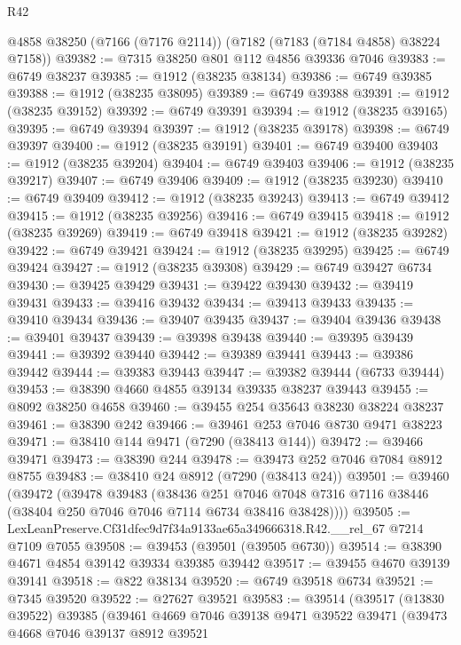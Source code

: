\begin{lexlean}{R42}
\begin{coremodule}
{    @4858
    @38250
    (@7166 (@7176 @2114))
    (@7182 (@7183 (@7184 @4858) @38224 @7158))
@39382 := @7315 @38250 @801 @112 @4856 @39336 @7046
@39383 := @6749 @38237
@39385 := @1912 (@38235 @38134)
@39386 := @6749 @39385
@39388 := @1912 (@38235 @38095)
@39389 := @6749 @39388
@39391 := @1912 (@38235 @39152)
@39392 := @6749 @39391
@39394 := @1912 (@38235 @39165)
@39395 := @6749 @39394
@39397 := @1912 (@38235 @39178)
@39398 := @6749 @39397
@39400 := @1912 (@38235 @39191)
@39401 := @6749 @39400
@39403 := @1912 (@38235 @39204)
@39404 := @6749 @39403
@39406 := @1912 (@38235 @39217)
@39407 := @6749 @39406
@39409 := @1912 (@38235 @39230)
@39410 := @6749 @39409
@39412 := @1912 (@38235 @39243)
@39413 := @6749 @39412
@39415 := @1912 (@38235 @39256)
@39416 := @6749 @39415
@39418 := @1912 (@38235 @39269)
@39419 := @6749 @39418
@39421 := @1912 (@38235 @39282)
@39422 := @6749 @39421
@39424 := @1912 (@38235 @39295)
@39425 := @6749 @39424
@39427 := @1912 (@38235 @39308)
@39429 := @6749 @39427 @6734
@39430 := @39425 @39429
@39431 := @39422 @39430
@39432 := @39419 @39431
@39433 := @39416 @39432
@39434 := @39413 @39433
@39435 := @39410 @39434
@39436 := @39407 @39435
@39437 := @39404 @39436
@39438 := @39401 @39437
@39439 := @39398 @39438
@39440 := @39395 @39439
@39441 := @39392 @39440
@39442 := @39389 @39441
@39443 := @39386 @39442
@39444 := @39383 @39443
@39447 := @39382 @39444 (@6733 @39444)
@39453 := @38390 @4660 @4855 @39134 @39335 @38237 @39443
@39455 := @8092 @38250 @4658
@39460 := @39455 @254 @35643 @38230 @38224 @38237
@39461 := @38390 @242
@39466 := @39461 @253 @7046 @8730 @9471 @38223
@39471 := @38410 @144 @9471 (@7290 (@38413 @144))
@39472 := @39466 @39471
@39473 := @38390 @244
@39478 := @39473 @252 @7046 @7084 @8912 @8755
@39483 := @38410 @24 @8912 (@7290 (@38413 @24))
@39501 := @39460
    (@39472
      (@39478
        @39483
        (@38436
          @251
          @7046
          @7048
          @7316
          @7116
          @38446
          (@38404 @250 @7046 @7046 @7114 @6734 @38416 @38428))))
@39505 := LexLeanPreserve.Cf31dfec9d7f34a9133ae65a349666318.R42.__rel_67 @7214 @7109 @7055
@39508 := @39453 (@39501 (@39505 @6730))
@39514 := @38390 @4671 @4854 @39142 @39334 @39385 @39442
@39517 := @39455 @4670 @39139 @39141
@39518 := @822 @38134
@39520 := @6749 @39518 @6734
@39521 := @7345 @39520
@39522 := @27627 @39521
@39583 := @39514
    (@39517
      (@13830 @39522)
      @39385
      (@39461
        @4669
        @7046
        @39138
        @9471
        @39522
        @39471
        (@39473
          @4668
          @7046
          @39137
          @8912
          @39521
}
\end{coremodule}
\end{lexlean}
